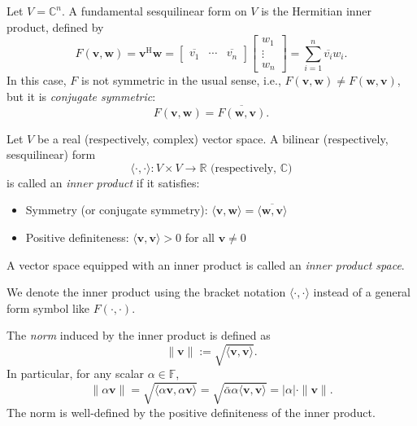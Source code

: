 \begin{example}\label{ex:hermitian-inner-product}
Let \( V = \mathbb{C}^n \). A fundamental sesquilinear form on \( V \) is the Hermitian inner product, defined by
\[
F(\mathbf{v}, \mathbf{w}) = \mathbf{v}^{\mathrm{H}} \mathbf{w} = 
\begin{bmatrix}
\overline{v_1} & \cdots & \overline{v_n}
\end{bmatrix}
\begin{bmatrix}
w_1 \\ \vdots \\ w_n
\end{bmatrix}
= \sum_{i=1}^n \overline{v_i} w_i.
\]
In this case, \( F \) is not symmetric in the usual sense, i.e., \( F(\mathbf{v}, \mathbf{w}) \neq F(\mathbf{w}, \mathbf{v}) \), but it is \emph{conjugate symmetric}:
\[
F(\mathbf{v}, \mathbf{w}) = \overline{F(\mathbf{w}, \mathbf{v})}.
\]
\end{example}

\begin{definition}\label{def:inner-product}
Let \( V \) be a real (respectively, complex) vector space. A bilinear (respectively, sesquilinear) form
\[
\langle \cdot, \cdot \rangle : V \times V \to \mathbb{R} \text{ (respectively, } \mathbb{C} \text{)}
\]
is called an \emph{inner product} if it satisfies:
\begin{itemize}
    \item Symmetry (or conjugate symmetry): \( \langle \mathbf{v}, \mathbf{w} \rangle = \overline{\langle \mathbf{w}, \mathbf{v} \rangle} \)
    \item Positive definiteness: \( \langle \mathbf{v}, \mathbf{v} \rangle > 0 \) for all \( \mathbf{v} \neq 0 \)
\end{itemize}
A vector space equipped with an inner product is called an \emph{inner product space}.
\end{definition}

\begin{remark}
We denote the inner product using the bracket notation \( \langle \cdot, \cdot \rangle \) instead of a general form symbol like \( F(\cdot, \cdot) \).
\end{remark}

\begin{definition}[Norm]\label{def:norm}
The \emph{norm} induced by the inner product is defined as
\[
\| \mathbf{v} \| := \sqrt{\langle \mathbf{v}, \mathbf{v} \rangle}.
\]
In particular, for any scalar \( \alpha \in \mathbb{F} \),
\[
\| \alpha \mathbf{v} \| = \sqrt{ \langle \alpha \mathbf{v}, \alpha \mathbf{v} \rangle }
= \sqrt{ \bar{\alpha} \alpha \langle \mathbf{v}, \mathbf{v} \rangle }
= |\alpha| \cdot \| \mathbf{v} \|.
\]
The norm is well-defined by the positive definiteness of the inner product.
\end{definition}

